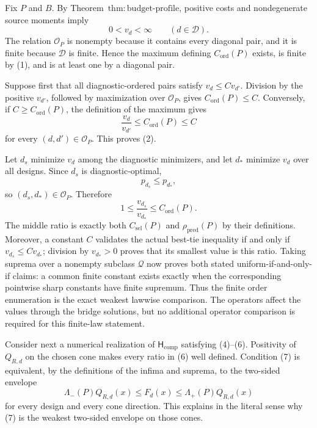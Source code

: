 Fix \(P\) and \(B\).  By Theorem~\(\mathrm{thm{:}budget\text{-}profile}\), positive costs and nondegenerate source moments imply
\[
 0<v_d<\infty
 \qquad(d\in\mathcal D).                                  \tag{1}
\]
The relation \(\mathcal O_P\) is nonempty because it contains every diagonal pair, and it is finite because \(\mathcal D\) is finite.  Hence the maximum defining \(C_{\mathrm{ord}}(P)\) exists, is finite by (1), and is at least one by a diagonal pair.

Suppose first that all diagnostic-ordered pairs satisfy \(v_d\le Cv_{d'}\).  Division by the positive \(v_{d'}\), followed by maximization over \(\mathcal O_P\), gives \(C_{\mathrm{ord}}(P)\le C\).  Conversely, if \(C\ge C_{\mathrm{ord}}(P)\), the definition of the maximum gives
\[
 \frac{v_d}{v_{d'}}\le C_{\mathrm{ord}}(P)\le C
\]
for every \((d,d')\in\mathcal O_P\).  This proves (2).

Let \(d_s\) minimize \(v_d\) among the diagnostic minimizers, and let \(d_*\) minimize \(v_d\) over all designs.  Since \(d_s\) is diagnostic-optimal,
\[
 p_{d_s}\le p_{d_*},
\]
so \((d_s,d_*)\in\mathcal O_P\).  Therefore
\[
 1\le
 \frac{v_{d_s}}{v_{d_*}}
 \le C_{\mathrm{ord}}(P).                                \tag{2}
\]
The middle ratio is exactly both \(C_{\mathrm{sel}}(P)\) and \(\rho_{\mathrm{pred}}(P)\) by their definitions.  Moreover, a constant \(C\) validates the actual best-tie inequality if and only if \(v_{d_s}\le Cv_{d_*}\); division by \(v_{d_*}>0\) proves that its smallest value is this ratio.  Taking suprema over a nonempty subclass \(\mathcal Q\) now proves both stated uniform-if-and-only-if claims: a common finite constant exists exactly when the corresponding pointwise sharp constants have finite supremum.  Thus the finite order enumeration is the exact weakest lawwise comparison.  The operators affect the values through the bridge solutions, but no additional operator comparison is required for this finite-law statement.

Consider next a numerical realization of \(\mathsf H_{\mathrm{comp}}\) satisfying (4)--(6).  Positivity of \(Q_{R,d}\) on the chosen cone makes every ratio in (6) well defined.  Condition (7) is equivalent, by the definitions of the infima and suprema, to the two-sided envelope
\[
 \Lambda_-(P)Q_{R,d}(x)
 \le F_d(x)
 \le\Lambda_+(P)Q_{R,d}(x)                               \tag{3}
\]
for every design and every cone direction.  This explains in the literal sense why (7) is the weakest two-sided envelope on those cones.

